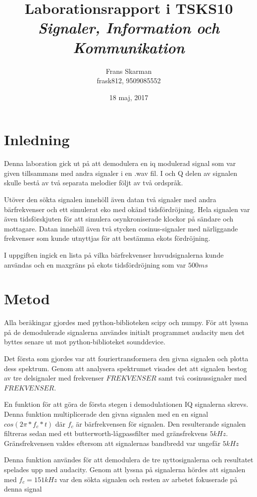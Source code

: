 \documentclass[10pt,twocolumn]{article}
\title{Laborationsrapport i TSKS10 \emph{Signaler, Information och Kommunikation}}
\author{Frans Skarman \\ frask812, 9509085552 }
\date{18 maj, 2017}
\begin{document}
\maketitle

\section{Inledning}

Denna laboration gick ut på att demodulera en iq modulerad signal som var given
tillsammans med andra signaler i en .wav fil. I och Q delen av signalen skulle
bestå av två separata melodier följt av två ordspråk.

Utöver den sökta signalen innehöll även datan två signaler med andra bärfrekvenser
och ett simulerat eko med okänd tidsfördröjning. Hela signalen var även tidsförskjuten
för att simulera osynkroniserade klockor på sändare och mottagare. Datan innehöll
även två stycken cosinus-signaler med närliggande frekvenser som kunde utnyttjas för
att bestämma ekots fördröjning.

I uppgiften ingick en lista på vilka bärfrekvenser huvudsignalerna kunde användas och
en maxgräns på ekots tidsfördröjning som var $500ms$



\section{Metod}

Alla beräkingar gjordes med python-biblioteken scipy och numpy. För att lyssna på de demodulerade
signalerna användes initialt programmet audacity men det byttes senare ut mot python-biblioteket
sounddevice.

Det första som gjordes var att fouriertransformera den givna signalen och plotta
dess spektrum. Genom att analysera spektrumet visades det att signalen bestog av tre
delsignaler med frekvenser $FREKVENSER$ samt två cosinussignaler med $FREKVENSER$.

En funktion för att göra de första stegen i demodulationen IQ signalerna skrevs. Denna
funktion multiplicerade den givna signalen med en en signal $cos(2\pi*f_c*t)$ där $f_c$
är bärfrekvensen för signalen. Den resulterande signalen filtreras sedan med ett 
butterworth-lågpassfilter med gränsfrekvens $5 kHz$. Gränsfrekvensen valdes eftersom
att signalernas bandbredd var ungefär $5 kHz$

Denna funktion användes för att demodulera de tre nyttosignalerna och resultatet spelades
upp med audacity. Genom att lyssna på signalerna hördes att signalen med $f_c=151kHz$ var
den sökta signalen och resten av arbetet fokuserade på denna signal
\end{document}
